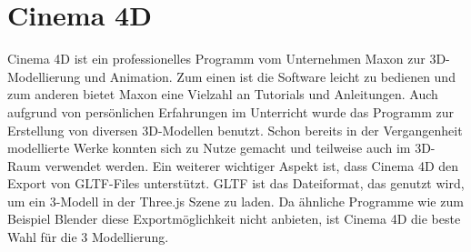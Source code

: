 \section{Cinema 4D}
Cinema 4D ist ein professionelles Programm vom Unternehmen Maxon zur 3D-Modellierung und Animation. Zum einen ist die Software leicht zu bedienen und zum anderen bietet Maxon eine Vielzahl an Tutorials und Anleitungen. Auch aufgrund von persönlichen Erfahrungen im Unterricht wurde das Programm zur Erstellung von diversen 3D-Modellen benutzt. Schon bereits in der Vergangenheit modellierte Werke konnten sich zu Nutze gemacht und teilweise auch im 3D-Raum verwendet werden. Ein weiterer wichtiger Aspekt ist, dass Cinema 4D den Export von GLTF-Files unterstützt. GLTF ist das Dateiformat, das genutzt wird, um ein 3-Modell in der Three.js Szene zu laden. Da ähnliche Programme wie zum Beispiel Blender diese Exportmöglichkeit nicht anbieten, ist Cinema 4D die beste Wahl für die 3 Modellierung. 